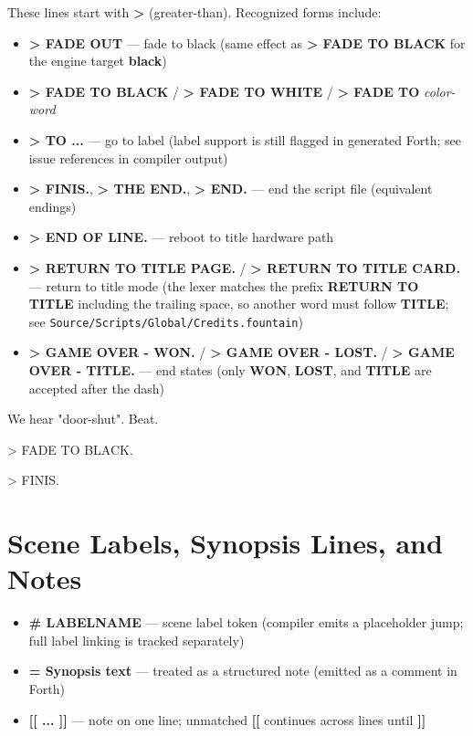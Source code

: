 \documentclass[11pt,letterpaper,oldstylefigures]{memoir}
\newcommand{\stagedir}[1]{#1\par\vspace{1\baselineskip}}
\newenvironment{FountainExample}
  {\begingroup
  \ttfamily\small
   \setlength{\parindent}{0pt}
  \setlength{\parskip}{0.5em}
  \allowdisplaybreaks
  \setlength{\displaywidowpenalty}{0}
  \setlength{\widowpenalty}{0}
  \setlength{\clubpenalty}{0}
  \setlength{\interlinepenalty}{0}
}
  {\endgroup}
\newcommand{\sceneendcmd}[1]{\begin{flushright}\ttfamily #1\end{flushright}}
\newcommand{\fountain}[1]{\textbf{#1}}
\begin{document}
These lines start with \fountain{>} (greater-than). Recognized forms include:

\begin{itemize}
\item \fountain{> FADE OUT} --- fade to black (same effect as \fountain{> FADE TO BLACK} for the engine target \fountain{black})
\item \fountain{> FADE TO BLACK} / \fountain{> FADE TO WHITE} / \fountain{> FADE TO} \emph{color-word}
\item \fountain{> TO ...} --- go to label (label support is still flagged in generated Forth; see issue references in compiler output)
\item \fountain{> FINIS.}, \fountain{> THE END.}, \fountain{> END.} --- end the script file (equivalent endings)
\item \fountain{> END OF LINE.} --- reboot to title hardware path
\item \fountain{> RETURN TO TITLE PAGE.} / \fountain{> RETURN TO TITLE CARD.} --- return to title mode (the lexer matches the prefix \fountain{RETURN TO TITLE } including the trailing space, so another word must follow \fountain{TITLE}; see \texttt{Source/Scripts/Global/Credits.fountain})
\item \fountain{> GAME OVER - WON.} / \fountain{> GAME OVER - LOST.} / \fountain{> GAME OVER - TITLE.} --- end states (only \fountain{WON}, \fountain{LOST}, and \fountain{TITLE} are accepted after the dash)
\end{itemize}

\begin{FountainExample}
\stagedir{We hear "door-shut". Beat.}
\sceneendcmd{> FADE TO BLACK.}
\sceneendcmd{> FINIS.}
\end{FountainExample}

\section{Scene Labels, Synopsis Lines, and Notes}

\begin{itemize}
\item \fountain{\# LABELNAME} --- scene label token (compiler emits a placeholder jump; full label linking is tracked separately)
\item \fountain{= Synopsis text} --- treated as a structured note (emitted as a comment in Forth)
\item \fountain{[[ ... ]]} --- note on one line; unmatched \fountain{[[} continues across lines until \fountain{]]}
\end{itemize}
\end{document}
